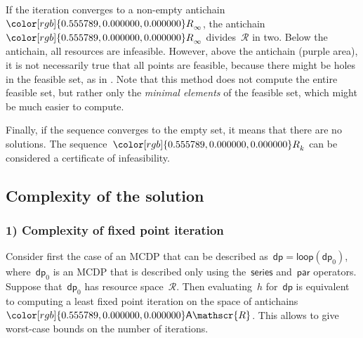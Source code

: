 \documentclass[twocolumn,english]{IEEEtran}
\theoremstyle{definition}
\theoremstyle{plain}
\theoremstyle{definition}
\theoremstyle{remark}
\theoremstyle{definition}
\theoremstyle{plain}
\theoremstyle{plain}
\newcommand{\aword}[1]{\mathsf{#1}}
\newcommand{\vmath}[1]{\aword{#1}}
\newcommand{\antichains}{\vmath{A}}
\newcommand{\ftor}{{h}}
\newcommand{\ressp}{\mathscr{R}}
\newcommand{\dprob}{\vmath{dp}}
\newcommand{\dpseries}{\vmath{series}}
\newcommand{\dppar}{\vmath{par}}
\newcommand{\dploop}{\vmath{loop}}
\newcommand{\Aressp}{{\antichains\ressp}}
\newcommand{\colR}{\color[rgb]{0.555789,0.000000,0.000000}}
\newcommand{\R}[1]{{\colR #1}}
\renewcommand{\Aressp}{{\colR\antichains\ressp}}
\begin{document}
If the iteration converges to a non-empty antichain~$\R{R}_{\infty}$,
the antichain~$\R{R}_{\infty}$ divides~$\ressp$ in two. Below
the antichain, all resources are infeasible. However, above the antichain
(purple area), it is not necessarily true that all points are feasible,
because there might be holes in the feasible set, as in .
Note that this method does not compute the entire feasible set, but
rather only the \emph{minimal elements} of the feasible set, which
might be much easier to compute.

Finally, if the sequence converges to the empty set, it means that
there are no solutions. The sequence~$\R{R}_{k}$ can be considered
a certificate of infeasibility.

\subsection{Complexity of the solution }


\subsubsection*{1) Complexity of fixed point iteration}

Consider first the case of an MCDP that can be described as~$\dprob=\dploop(\dprob_{0})$,
where~$\dprob_{0}$ is an MCDP that is described only using the~$\dpseries$
and~$\dppar$ operators. Suppose that~$\dprob_{0}$ has resource
space~$\ressp$. Then evaluating~$\ftor$ for~$\dprob$ is equivalent
to computing a least fixed point iteration on the space of antichains~$\Aressp$.
This allows to give worst-case bounds on the number of iterations.
\end{document}
